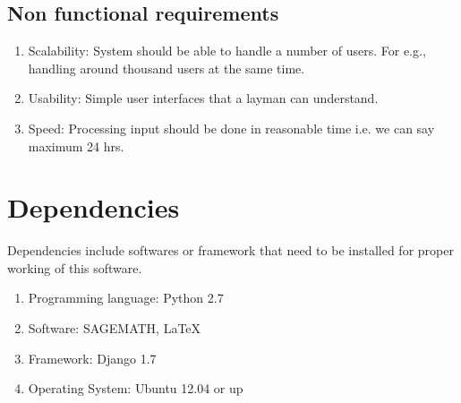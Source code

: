 \begin{itemize}
\begin{enumerate}
\end{enumerate}
\vskip 0.5cm
\subsection{Non functional requirements}
\begin{enumerate} 
\item Scalability: System should be able to handle a number of users. 
For e.g., handling around thousand users at the same time.
\item Usability: Simple user interfaces that a layman can understand.
\item Speed: Processing input should be done in reasonable time
 i.e. we can say maximum 24 hrs.
\end{enumerate}
\end{itemize}


\section{Dependencies}
Dependencies include softwares or framework that need to be installed for 
proper working of this software.

\begin{enumerate} 
\item Programming language: Python 2.7
\item Software: SAGEMATH, \LaTeX{}
\item Framework: Django 1.7
\item Operating System: Ubuntu 12.04 or up
\end{enumerate}

